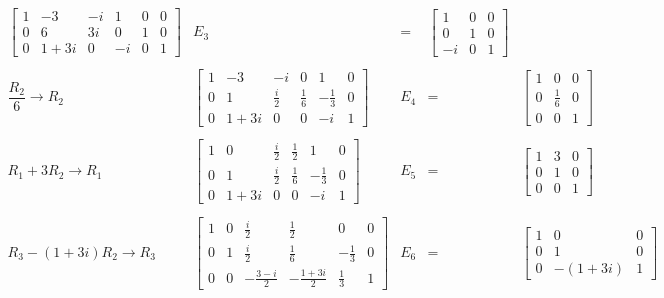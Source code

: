 \begin{enumerate}[\bfseries 1.]
$$\begin{array}{rlrcl}
	    \left[
		\begin{array}{rrr|rrr}
		    1 & -3 & -i &  1 & 0 & 0 \\
		    0 & 6 & 3i &  0 & 1 & 0 \\
		    0 & 1+3i & 0 &  -i & 0 & 1
		\end{array}
	    \right]
	    &E_3&=&
	    \left[
		\begin{array}{rrr}
		    1&0&0\\
		    0&1&0\\
		    -i&0&1
		\end{array}
	    \right]\\\\
	    \dfrac{R_2}{6} \to R_2&
	    \left[
		\begin{array}{rrr|rrr}
		    1 & -3 & -i &  0 & 1 & 0 \\
		    0 & 1 & \frac{i}{2} &  \frac{1}{6} & -\frac{1}{3} & 0 \\
		    0 & 1+3i & 0 &  0 & -i & 1
		\end{array}
	    \right]
	    &E_4&=&
	    \left[
		\begin{array}{rrr}
		    1&0&0\\
		    0&\frac{1}{6}&0\\
		    0&0&1
		\end{array}
	    \right]\\\\
	    R_1+3R_2\to R_1&
	    \left[
		\begin{array}{rrr|rrr}
		    1 & 0 & \frac{i}{2} &  \frac{1}{2} & 1 & 0 \\
		    0 & 1 & \frac{i}{2} &  \frac{1}{6} & -\frac{1}{3} & 0 \\
		    0 & 1+3i & 0 &  0 & -i & 1
		\end{array}
	    \right]
	    &E_5&=&
	    \left[
		\begin{array}{rrr}
		    1&3&0\\
		    0&1&0\\
		    0&0&1
		\end{array}
	    \right]\\\\
	    R_3-(1+3i)R_2\to R_3&
	    \left[
		\begin{array}{rrr|rrr}
		    1 & 0 & \frac{i}{2} &  \frac{1}{2} & 0 & 0 \\
		    0 & 1 & \frac{i}{2} &  \frac{1}{6} & -\frac{1}{3} & 0 \\
		    0 & 0 & -\frac{3-i}{2} &  -\frac{1+3i}{2} & \frac{1}{3} & 1
		\end{array}
	    \right]
	    &E_6&=&
	    \left[
		\begin{array}{rrr}
		    1&0&0\\
		    0&1&0\\
		    0&-(1+3i)&1
		\end{array}
	    \right]
	\end{array}
	$$


\end{enumerate}
